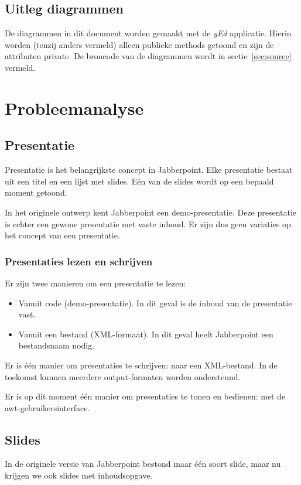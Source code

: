 \documentclass[a4paper]{article}
\begin{document}
	\subsection*{Uitleg diagrammen}
		De diagrammen in dit document worden gemaakt met de \textit{yEd} applicatie.
		Hierin worden (tenzij anders vermeld) alleen publieke methods getoond en zijn de attributen private.
		De broncode van de diagrammen wordt in sectie~\ref{sec:source} vermeld.
	
\section{Probleemanalyse}
    \label{sec:probleemanalyse}

	\subsection{Presentatie}\label{sec:presentatie-analyse}
		Presentatie is het belangrijkste concept in Jabberpoint.
		Elke presentatie bestaat uit een titel en een lijst met slides.
		Eén van de slides wordt op een bepaald moment getoond.

		In het originele ontwerp kent Jabberpoint een demo-presentatie.
		Deze presentatie is echter een gewone presentatie met vaste inhoud.
		Er zijn dus geen variaties op het concept van een presentatie.

		\subsubsection{Presentaties lezen en schrijven}
			Er zijn twee manieren om een presentatie te lezen:
			\begin{itemize}
				\item Vanuit code (demo-presentatie).
					In dit geval is de inhoud van de presentatie vast.
				\item Vanuit een bestand (XML-formaat).
					In dit geval heeft Jabberpoint een bestandsnaam nodig.
			\end{itemize}

			Er is één manier om presentaties te schrijven: naar een XML-bestand.
			In de toekomst kunnen meerdere output-formaten worden ondersteund.

			Er is op dit moment één manier om presentaties te tonen en bedienen: met de awt-gebruikersinterface.

	\subsection{Slides}\label{sec:slides-analyse}
		In de originele versie van Jabberpoint bestond maar één soort slide, maar nu krijgen we ook slides met inhoudsopgave.
\end{document}
